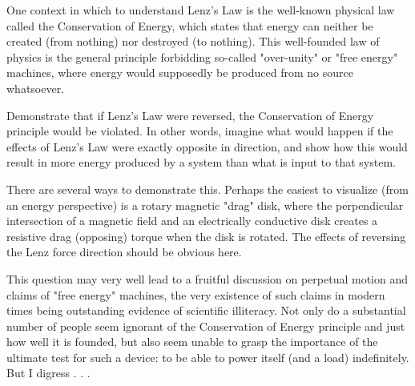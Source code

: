 

One context in which to understand Lenz's Law is the well-known physical law called the Conservation of Energy, which states that energy can neither be created (from nothing) nor destroyed (to nothing).  This well-founded law of physics is the general principle forbidding so-called "over-unity" or "free energy" machines, where energy would supposedly be produced from no source whatsoever.

Demonstrate that if Lenz's Law were reversed, the Conservation of Energy principle would be violated.  In other words, imagine what would happen if the effects of Lenz's Law were exactly opposite in direction, and show how this would result in more energy produced by a system than what is input to that system.







There are several ways to demonstrate this.  Perhaps the easiest to visualize (from an energy perspective) is a rotary magnetic "drag" disk, where the perpendicular intersection of a magnetic field and an electrically conductive disk creates a resistive drag (opposing) torque when the disk is rotated.  The effects of reversing the Lenz force direction should be obvious here.







This question may very well lead to a fruitful discussion on perpetual motion and claims of "free energy" machines, the very existence of such claims in modern times being outstanding evidence of scientific illiteracy.  Not only do a substantial number of people seem ignorant of the Conservation of Energy principle and just how well it is founded, but also seem unable to grasp the importance of the ultimate test for such a device: to be able to power itself (and a load) indefinitely.  But I digress . . .




